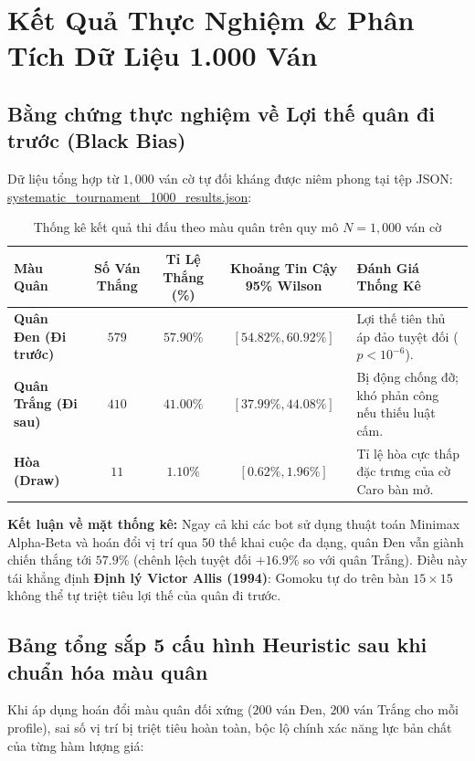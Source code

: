 \documentclass[11pt,a4paper]{article}
\begin{document}
\FloatBarrier
\section{Kết Quả Thực Nghiệm \& Phân Tích Dữ Liệu 1.000 Ván}

\subsection{Bằng chứng thực nghiệm về Lợi thế quân đi trước (Black Bias)}
Dữ liệu tổng hợp từ $1{,}000$ ván cờ tự đối kháng được niêm phong tại tệp JSON:\\
\url{systematic_tournament_1000_results.json}:

\begin{table}[htbp]
\centering
\small
\caption{Thống kê kết quả thi đấu theo màu quân trên quy mô $N = 1{,}000$ ván cờ}
\label{tab:color_stats}
\begin{tabularx}{\textwidth}{l c c c X}
\toprule
\textbf{Màu Quân} & \textbf{Số Ván Thắng} & \textbf{Tỉ Lệ Thắng (\%)} & \textbf{Khoảng Tin Cậy 95\% Wilson} & \textbf{Đánh Giá Thống Kê} \\
\midrule
\textbf{Quân Đen (Đi trước)}  & \textbf{$579$} & \textbf{$57.90\%$} & $[54.82\%, 60.92\%]$ & Lợi thế tiên thủ áp đảo tuyệt đối ($p < 10^{-6}$). \\
\textbf{Quân Trắng (Đi sau)} & $410$ & $41.00\%$ & $[37.99\%, 44.08\%]$ & Bị động chống đỡ; khó phản công nếu thiếu luật cấm. \\
\textbf{Hòa (Draw)}           & $11$  & $1.10\%$  & $[0.62\%, 1.96\%]$   & Tỉ lệ hòa cực thấp đặc trưng của cờ Caro bàn mở. \\
\bottomrule
\end{tabularx}
\end{table}

\textbf{Kết luận về mặt thống kê:} Ngay cả khi các bot sử dụng thuật toán Minimax Alpha-Beta và hoán đổi vị trí qua 50 thế khai cuộc đa dạng, quân Đen vẫn giành chiến thắng tới $57.9\%$ (chênh lệch tuyệt đối \textbf{$+16.9\%$} so với quân Trắng). Điều này tái khẳng định \textbf{Định lý Victor Allis (1994)}: Gomoku tự do trên bàn $15 \times 15$ không thể tự triệt tiêu lợi thế của quân đi trước.

\subsection{Bảng tổng sắp 5 cấu hình Heuristic sau khi chuẩn hóa màu quân}
Khi áp dụng hoán đổi màu quân đối xứng ($200$ ván Đen, $200$ ván Trắng cho mỗi profile), sai số vị trí bị triệt tiêu hoàn toàn, bộc lộ chính xác năng lực bản chất của từng hàm lượng giá:
\end{document}
